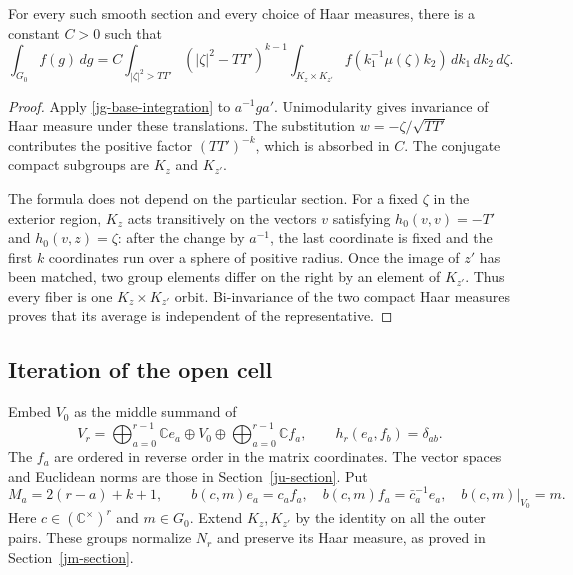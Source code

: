 \begin{corollary}\label{jg-terminal-measure}
For every such smooth section and every choice of Haar measures,
there is a constant \(C>0\) such that
\begin{equation}\label{jg-terminal}
 \int_{G_0}f(g)\,dg
 =C\int_{|\zeta|^2>TT'}(|\zeta|^2-TT')^{k-1}
      \int_{K_z\times K_{z'}}
        f(k_1^{-1}\mu(\zeta)k_2)\,dk_1\,dk_2\,d\zeta .
\end{equation}
\end{corollary}

\begin{proof}
Apply \eqref{jg-base-integration} to \(a^{-1}g a'\).
Unimodularity gives invariance of Haar measure under these
translations.  The substitution
\(w=-\zeta/\sqrt{TT'}\) contributes the positive factor
\((TT')^{-k}\), which is absorbed in \(C\).
The conjugate compact subgroups are \(K_z\) and \(K_{z'}\).

The formula does not depend on the particular section.
For a fixed \(\zeta\) in the exterior region, \(K_z\) acts
transitively on the vectors \(v\) satisfying
\(h_0(v,v)=-T'\) and \(h_0(v,z)=\zeta\):
after the change by \(a^{-1}\), the last coordinate is fixed
and the first \(k\) coordinates run over a sphere of positive
radius.  Once the image of \(z'\) has been matched, two group
elements differ on the right by an element of \(K_{z'}\).
Thus every fiber is one \(K_z\times K_{z'}\) orbit.
Bi-invariance of the two compact Haar measures proves that its
average is independent of the representative.
\end{proof}

\subsection{Iteration of the open cell}

Embed \(V_0\) as the middle summand of
\[
 V_r=\bigoplus_{a=0}^{r-1}\mathbb C e_a
          \oplus V_0\oplus
             \bigoplus_{a=0}^{r-1}\mathbb C f_a,\qquad
 h_r(e_a,f_b)=\delta_{ab}.
\]
The \(f_a\) are ordered in reverse order in the matrix coordinates.
The vector spaces and Euclidean norms are those in
Section~\ref{ju-section}.  Put
\[
       M_a=2(r-a)+k+1,\qquad
       b(c,m)e_a=c_a f_a,\quad
       b(c,m)f_a=\bar c_a^{-1}e_a,\quad
       b(c,m)|_{V_0}=m .
\]
Here \(c\in(\mathbb C^\times)^r\) and \(m\in G_0\).
Extend \(K_z,K_{z'}\) by the identity on all the outer pairs.
These groups normalize \(N_r\) and preserve its Haar measure,
as proved in Section~\ref{jm-section}.

